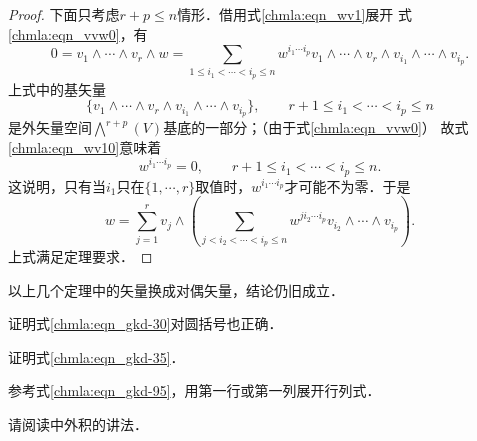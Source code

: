 \begin{proof}
    下面只考虑$r+p\leqslant  n$情形．借用式\eqref{chmla:eqn_wv1}展开
    式\eqref{chmla:eqn_vvw0}，有
    \begin{equation}\label{chmla:eqn_wv10}
        0=v_1 \wedge \cdots \wedge v_r \wedge w=  \sum_{1\leqslant {i_1} < \cdots <i_p  \leqslant n }
        w^{i_1\cdots i_p} v_1 \wedge \cdots \wedge v_r \wedge v_{i_1}\wedge \cdots \wedge v_{i_p} .
    \end{equation}
    上式中的基矢量
    \begin{equation}
        \{v_1 \wedge \cdots \wedge v_r \wedge v_{i_1}\wedge \cdots \wedge v_{i_p}\},
        \qquad r+1 \leqslant i_1<\cdots<i_p\leqslant n
    \end{equation}
    是外矢量空间$\bigwedge^{r+p}(V)$基底的一部分；（由于式\eqref{chmla:eqn_vvw0}）
    故式\eqref{chmla:eqn_wv10}意味着
    \begin{equation}
        w^{i_1\cdots i_p} = 0, \qquad r+1 \leqslant i_1<\cdots<i_p\leqslant n .
    \end{equation}
    这说明，只有当$i_1$只在$\{1,\cdots,r\}$取值时，$w^{i_1\cdots i_p}$才可能不为零．于是
    \begin{equation}
        w = \sum_{j=1}^{r}v_j \wedge \left(
        \sum_{j< {i_2} < \cdots <i_p  \leqslant n }
        w^{ji_2\cdots i_p} v_{i_2}\wedge \cdots \wedge v_{i_p} \right).
    \end{equation}
    上式满足定理要求．
\end{proof}


以上几个定理中的矢量换成对偶矢量，结论仍旧成立．

\begin{exercise}
	证明式\eqref{chmla:eqn_gkd-30}对圆括号也正确．
\end{exercise}

\begin{exercise}
	证明式\eqref{chmla:eqn_gkd-35}．
\end{exercise}


\begin{exercise}
	参考式\eqref{chmla:eqn_gkd-95}，用第一行或第一列展开行列式．
\end{exercise}


\begin{exercise}
	请阅读\textcite[\S 2.3]{cc2001-zh}中外积的讲法．
\end{exercise}



